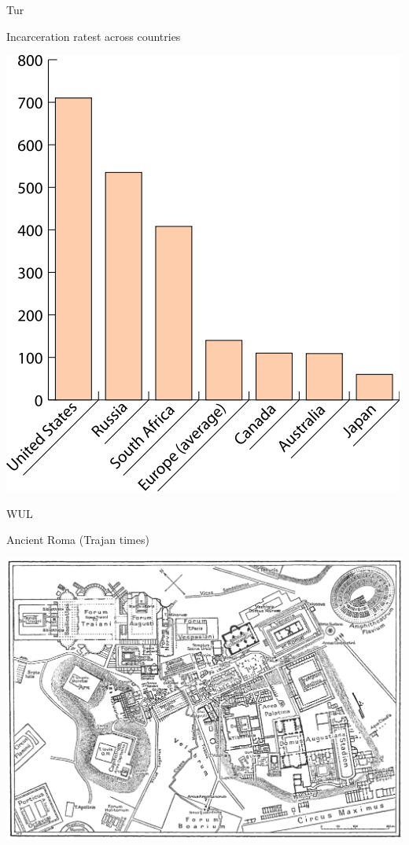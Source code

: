 \begin{map}{T}{ur}
\caption{Incarceration ratest across countries}
\label{chart:incarceration}
\includegraphics[width=\chartwidth,height=\chartheight]{incarceration}  
\end{map}

\begin{map}{W}{UL}
\caption{Ancient Roma  (Trajan times)}
\label{map:roma}
\includegraphics[width=\chartwidth,height=\chartheight]{Rome}
\end{map}

